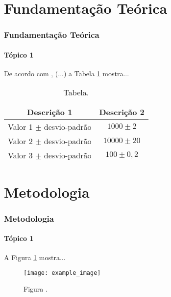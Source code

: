 \section{Fundamentação Teórica}

\begin{frame}
    \frametitle{Fundamentação Teórica}
    \framesubtitle{Tópico 1}
    
    De acordo com , (...) a Tabela \ref{table:1} 
    mostra...
    
    \begin{table}[h!]
        \centering
        \caption{Tabela.}
        \label{table:1}
        
            \begin{tabular}[]{cc}
                
                \hline
                Descrição 1 &  Descrição 2 \\
                \hline
                \hline
                Valor 1 $\pm$ desvio-padrão & $ 1000 \pm 2 $ \\
                Valor 2 $\pm$ desvio-padrão & $ 10000 \pm 20 $\\
                Valor 3 $\pm$ desvio-padrão & $ 100 \pm 0,2 $ \\ [1ex]
                \hline
            
            \end{tabular}
    
    \end{table}
    


\end{frame}

\section{Metodologia}

\begin{frame}
    \frametitle{Metodologia}
    \framesubtitle{Tópico 1}
    
    A Figura \ref{fig:1} mostra...

    \begin{figure}
        
        \centering
        \texttt{[image: example\_image]}
        \caption{Figura \cite{article}.}
        \label{fig:1}
        
     \end{figure}

\end{frame}

